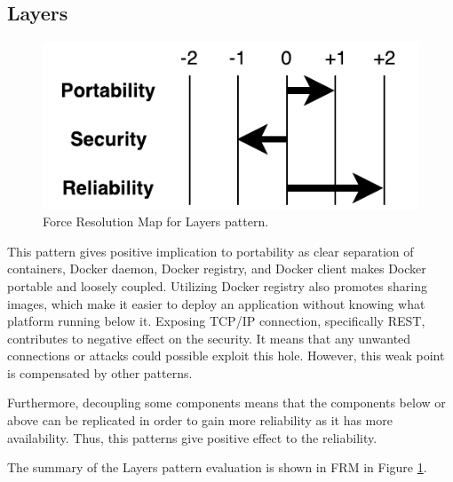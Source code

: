 \subsection{Layers}

\begin{figure}[H]
\centering
\includegraphics[scale=0.7]{6-evaluation/images/layers_frm.pdf}
\caption{Force Resolution Map for Layers pattern.}
\label{fig:layers-frm}
\end{figure}

This pattern gives positive implication to portability as clear separation of
containers, Docker daemon, Docker registry, and Docker client makes Docker
portable and loosely coupled. Utilizing Docker registry also promotes sharing
images, which make it easier to deploy an application without knowing what
platform running below it. Exposing TCP/IP connection, specifically REST,
contributes to negative effect on the security. It means that any unwanted
connections or attacks could possible exploit this hole. However, this weak
point is compensated by other patterns. 

Furthermore, decoupling some components
means that the components below or above can be replicated in order to gain more
reliability as it has more availability. Thus, this patterns give positive
effect to the reliability. 

The summary of the Layers pattern evaluation is shown
in FRM in Figure \ref{fig:layers-frm}.


